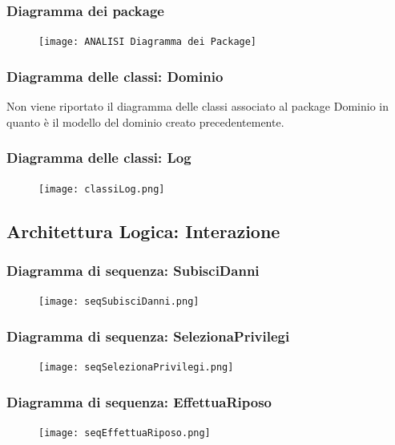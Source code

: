 \documentclass[a4paper, 11pt]{article}
\begin{document}
\subsubsection{Diagramma dei package}
\vspace{1em}
\begin{figure}[h!]
    \centering
    \texttt{[image: ANALISI Diagramma dei Package]}
    \label{fig:packageAnalisi}
\end{figure}
\subsubsection*{Diagramma delle classi: Dominio}
Non viene riportato il diagramma delle classi associato al package Dominio in quanto è il modello del dominio creato precedentemente.
\subsubsection*{Diagramma delle classi: Log}
\begin{figure}[h!]
    \centering
    \texttt{[image: classiLog.png]}
    \label{fig:classiLog}
\end{figure}

\clearpage
\newpage
\subsection{Architettura Logica: Interazione}
\subsubsection*{Diagramma di sequenza: SubisciDanni}
\begin{figure}[h!]
    \centering
    \texttt{[image: seqSubisciDanni.png]}
    \label{fig:subisciDanni}
\end{figure}
\subsubsection*{Diagramma di sequenza: SelezionaPrivilegi}
\begin{figure}[h!]
    \centering
    \texttt{[image: seqSelezionaPrivilegi.png]}
    \label{fig:selezionaPrivilegi}
\end{figure}

\clearpage
\newpage
\subsubsection*{Diagramma di sequenza: EffettuaRiposo}
\begin{figure}[h!]
    \centering
    \texttt{[image: seqEffettuaRiposo.png]}
    \label{fig:effettuaRiposo}
\end{figure}
\end{document}
